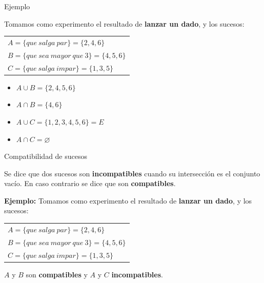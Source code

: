 \documentclass[11pt]{beamer}
\begin{document}
\begin{frame}
{Ejemplo}

 Tomamos como experimento el resultado de \textbf{lanzar un dado}, y los sucesos: \\
\begin{tabular}{l}
$A=\lbrace que\ salga\ par\rbrace=\lbrace2,4,6\rbrace$ \\
$B=\lbrace que\ sea\ mayor\ que\ 3\rbrace=\lbrace4,5,6\rbrace$ \\
$C=\lbrace que\ salga\ impar\rbrace=\lbrace1,3,5\rbrace$
\end{tabular}

\begin{itemize}	[<+->]
	\item $A\cup B=\lbrace2,4,5,6\rbrace$ \\
	\item $A\cap B=\lbrace4,6\rbrace$\\

	\item $A\cup C=\lbrace1,2,3,4,5,6\rbrace=E$
	\item $A\cap C=\varnothing$
\end{itemize}

\end{frame}


\begin{frame}{Compatibilidad de sucesos}
\begin{block}{}
Se dice que dos sucesos son \textbf{incompatibles} cuando su intersección es el conjunto vacío. En caso contrario se dice que son \textbf{compatibles}.
\end{block}
\pause
\textbf{Ejemplo:} Tomamos como experimento el resultado de \textbf{lanzar un dado}, y los sucesos: \\
\begin{tabular}{l}
$A=\lbrace que\ salga\ par\rbrace=\lbrace2,4,6\rbrace$ \\
$B=\lbrace que\ sea\ mayor\ que\ 3\rbrace=\lbrace4,5,6\rbrace$ \\
$C=\lbrace que\ salga\ impar\rbrace=\lbrace1,3,5\rbrace$
\end{tabular}
\newline
$A$ y $B$ son \textbf{compatibles} y $A$ y $C$ \textbf{incompatibles}.

\end{frame}
\end{document}
